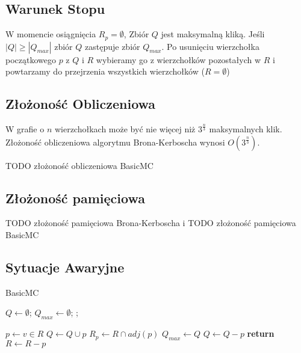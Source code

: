 \documentclass[12pt, a4paper]{article}
\begin{document}
\subsection{Warunek Stopu}

W momencie osiągnięcia $R_{p} = \emptyset$, Zbiór $Q$ jest maksymalną kliką. Jeśli $|Q| \ge |Q_{max}|$ zbiór $Q$ zastępuje zbiór $Q_{max}$. Po usunięciu wierzchołka początkowego $p$ z $Q$ i $R$ wybieramy go z wierzchołków pozostałych w $R$ i powtarzamy do przejrzenia wszystkich wierzchołków ($R = \emptyset$)

\subsection{Złożoność Obliczeniowa}
W grafie o $n$ wierzchołkach może być nie więcej niż $3^{\frac{n}{3}}$ maksymalnych klik. Złożoność obliczeniowa algorytmu Brona-Kerboscha wynosi $O(3^{\frac{n}{3}})$.

TODO złożoność obliczeniowa BasicMC

\subsection{Złożoność pamięciowa}
TODO złożoność pamięciowa Brona-Kerboscha i 
TODO złożoność pamięciowa BasicMC

\subsection{Sytuacje Awaryjne}

\begin{algorithm}
\caption{BasicMC}\label{basicmc}
\begin{algorithmic}[1]
  
\State $Q\gets \emptyset$;
\State $Q_{max}\gets \emptyset$;
\State {};
\EndProcedure
\Statex

  \State $p\gets v\in R$
    \State $Q \gets Q \cup {p}$\label{addPToQ}
    \State $R_p \gets R \cap adj(p)$
      \State {}
      \State $Q_{max} \gets Q$
    \EndIf
    \State $Q \gets Q - {p}$
  \Else
    \textbf{ return}\label{skip}
  \EndIf
  \State $R \gets R - p$
\EndWhile
\EndProcedure

\end{algorithmic}
\end{algorithm}
\end{document}
